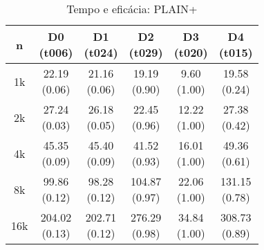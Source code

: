 \begin{table}[h]
    \centering
    \caption{Tempo e eficácia: PLAIN+\label{results-plain-1}}
    \begin{tabular}{cccccc}
        \toprule
        n & \makecell{D0 \\ (t006)} & \makecell{D1 \\ (t024)} & \makecell{D2 \\ (t029)} & \makecell{D3 \\ (t020)} & \makecell{D4 \\ (t015)}\\ \midrule
        1k & \specialcell{22.19 \\ (0.06)} & \specialcell{21.16 \\ (0.06)} & \specialcell{19.19 \\ (0.90)} & \specialcell{9.60 \\ (1.00)} & \specialcell{19.58 \\ (0.24)}\\ \midrule
        2k & \specialcell{27.24 \\ (0.03)} & \specialcell{26.18 \\ (0.05)} & \specialcell{22.45 \\ (0.96)} & \specialcell{12.22 \\ (1.00)} & \specialcell{27.38 \\ (0.42)}\\ \midrule
        4k & \specialcell{45.35 \\ (0.09)} & \specialcell{45.40 \\ (0.09)} & \specialcell{41.52 \\ (0.93)} & \specialcell{16.01 \\ (1.00)} & \specialcell{49.36 \\ (0.61)}\\ \midrule
        8k & \specialcell{99.86 \\ (0.12)} & \specialcell{98.28 \\ (0.12)} & \specialcell{104.87 \\ (0.97)} & \specialcell{22.06 \\ (1.00)} & \specialcell{131.15 \\ (0.78)}\\ \midrule
        16k & \specialcell{204.02 \\ (0.13)} & \specialcell{202.71 \\ (0.12)} & \specialcell{276.29 \\ (0.98)} & \specialcell{34.84 \\ (1.00)} & \specialcell{308.73 \\ (0.89)}\\ \bottomrule
        \end{tabular}
\end{table}
